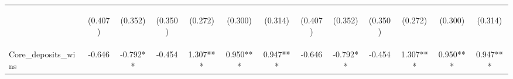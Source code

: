 \documentclass[]{article}
\begin{document}
\begin{center}
\begin{tabular}{lcccccccccccc}
\vspace{4pt} & \begin{footnotesize}(0.407)\end{footnotesize} & \begin{footnotesize}(0.352)\end{footnotesize} & \begin{footnotesize}(0.350)\end{footnotesize} & \begin{footnotesize}(0.272)\end{footnotesize} & \begin{footnotesize}(0.300)\end{footnotesize} & \begin{footnotesize}(0.314)\end{footnotesize} & \begin{footnotesize}(0.407)\end{footnotesize} & \begin{footnotesize}(0.352)\end{footnotesize} & \begin{footnotesize}(0.350)\end{footnotesize} & \begin{footnotesize}(0.272)\end{footnotesize} & \begin{footnotesize}(0.300)\end{footnotesize} & \begin{footnotesize}(0.314)\end{footnotesize} \\
Core\_deposits\_wins & -0.646 & -0.792** & -0.454 & 1.307*** & 0.950*** & 0.947*** & -0.646 & -0.792** & -0.454 & 1.307*** & 0.950*** & 0.947*** \\

\end{tabular}
\end{center}
\end{document}
